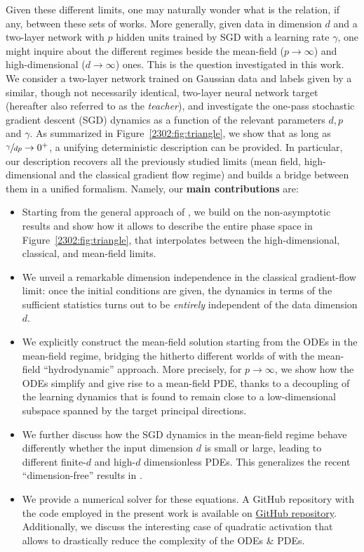 Given these different limits, one may naturally wonder what is the relation, if any, between these sets of works. More generally, given data in dimension $d$ and a two-layer network with $p$ hidden units trained by SGD with a learning rate $\gamma$, one might inquire about the different regimes beside the mean-field ($p \to \infty$) and high-dimensional ($d \to \infty$) ones. This is the question investigated in this work. We consider a two-layer network trained on Gaussian data and labels given by a similar, though not necessarily identical, two-layer neural network target (hereafter also referred to as the \emph{teacher}), and investigate the one-pass stochastic gradient descent (SGD) dynamics as a function of the relevant parameters $d,p$ and $\gamma$. As summarized in Figure~\ref{2302:fig:triangle}, we show that as long as $\sfrac{\gamma}{dp} \to 0^+$, a unifying deterministic description can be provided. In particular, our description recovers all the previously studied limits (mean field, high-dimensional and the classical gradient flow regime) and builds a bridge between them in a unified formalism. Namely, our \textbf{main contributions} are:
\begin{itemize}
    \item Starting from the general approach of \cite{saad1995line,saad1996dynamics}, we build on the non-asymptotic results \cite{veiga2022phase} and show how it allows to describe the entire phase space in Figure~\ref{2302:fig:triangle}, that interpolates between the high-dimensional, classical, and mean-field limits.
     \item We unveil a remarkable dimension independence  in the classical gradient-flow limit: once the initial conditions are given, the dynamics in terms of the sufficient statistics turns out to be {\it entirely} independent of the data dimension $d$.
     \item We explicitly construct the mean-field solution starting from the ODEs in the mean-field regime, bridging the hitherto different worlds of \citep{saad1995line,saad1996dynamics} with the mean-field ``hydrodynamic'' approach. More precisely, for $p \to \infty$, we show how the ODEs simplify and give rise to a mean-field PDE, thanks to a decoupling of the learning dynamics that is found to remain close to a low-dimensional subspace spanned by the target principal directions.
    \item We further discuss how the SGD dynamics in the mean-field regime behave differently whether the input dimension $d$ is small or large, leading to different finite-$d$ and high-$d$ dimensionless PDEs. This generalizes the recent ``dimension-free'' results in \cite{hajjar2023symmetries,abbe2022merged}.
    \item We provide a numerical solver for these equations. A GitHub repository with the code employed in the present work is available  on \href{https://github.com/IdePHICS/DimensionlessDynamicsSGD}{GitHub repository}.  Additionally, we discuss the interesting case of quadratic activation that allows to drastically reduce the complexity of the ODEs \& PDEs.
\end{itemize}


